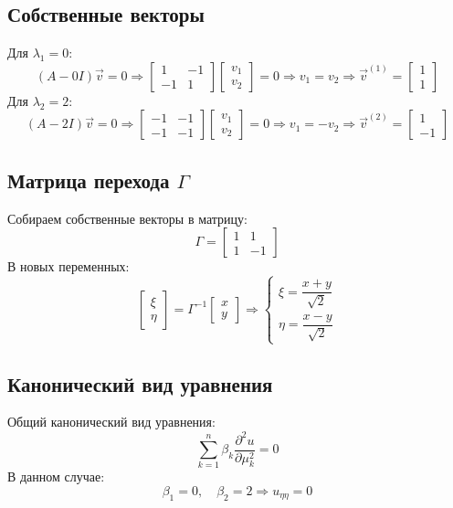 \documentclass{article}
\begin{document}
\subsection{Собственные векторы}
Для \( \lambda_1 = 0 \):
\[
(A - 0I) \vec{v} = 0 \Rightarrow
\begin{bmatrix}
1 & -1 \\
-1 & 1
\end{bmatrix}
\begin{bmatrix}
v_1 \\
v_2
\end{bmatrix}
= 0 \Rightarrow v_1 = v_2
\Rightarrow \vec{v}^{(1)} = \begin{bmatrix} 1 \\ 1 \end{bmatrix}
\]
Для \( \lambda_2 = 2 \):
\[
(A - 2I) \vec{v} = 0 \Rightarrow
\begin{bmatrix}
-1 & -1 \\
-1 & -1
\end{bmatrix}
\begin{bmatrix}
v_1 \\
v_2
\end{bmatrix}
= 0 \Rightarrow v_1 = -v_2
\Rightarrow \vec{v}^{(2)} = \begin{bmatrix} 1 \\ -1 \end{bmatrix}
\]

\subsection{Матрица перехода \(\Gamma\) }
Собираем собственные векторы в матрицу:
\[
\Gamma = 
\begin{bmatrix}
1 & 1 \\
1 & -1
\end{bmatrix}
\]
В новых переменных:
\[
\begin{bmatrix}
\xi \\
\eta
\end{bmatrix}
= \Gamma^{-1}
\begin{bmatrix}
x \\
y
\end{bmatrix}
\Rightarrow
\begin{cases}
\xi = \dfrac{x + y}{\sqrt{2}} \\
\eta = \dfrac{x - y}{\sqrt{2}}
\end{cases}
\]
\subsection{Канонический вид уравнения}
Общий канонический вид уравнения:
\[
\sum_{k=1}^{n} \beta_k \dfrac{\partial^2 u}{\partial \mu_k^2} = 0 
\]
В данном случае:
\[
\beta_1 = 0, \quad \beta_2 = 2 \Rightarrow u_{\eta\eta} = 0
\]
\end{document}
